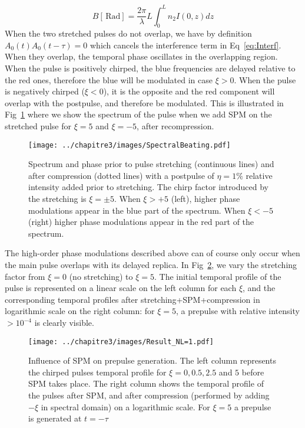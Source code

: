 \begin{equation}
B[\,\mathrm{Rad}] = \frac{2\pi}{\lambda}L \int_{0}^{L}n_2 I(0,z)dz
\end{equation}
\noindent  When the two stretched pulses do not overlap, we have by definition $A_0(t)A_0(t-\tau) = 0$ which cancels the interference term in Eq~\ref{eq:Interf}. When they overlap, the temporal phase oscillates in the overlapping region. When the pulse is positively chirped, the blue frequencies are delayed relative to the red ones, therefore the blue will be modulated in case $\xi>0$. When the pulse is negatively chirped ($\xi < 0$), it is the opposite and the red component will overlap with the postpulse, and therefore be modulated. This is illustrated in Fig~\ref{fig:SpectralBeating} where we show the spectrum of the pulse when we add SPM on the stretched pulse for $\xi = 5$ and $\xi = -5$, after recompression.


\begin{figure}[H]
\centering
\texttt{[image: ../chapitre3/images/SpectralBeating.pdf]}\\
\caption{\label{fig:SpectralBeating} Spectrum and phase prior to pulse stretching (continuous lines) and after compression (dotted lines) with a postpulse of $\eta = 1\%$ relative intensity added prior to stretching. The chirp factor introduced by the stretching is $\xi = \pm 5$. When $\xi>+5$ (left), higher phase modulations appear in the blue part of the spectrum. When $\xi <-5$ (right) higher phase modulations appear in the red part of the spectrum.}
\end{figure}




\noindent  The high-order phase modulations described above can of course only occur when the main pulse overlaps with its delayed replica. In Fig~\ref{fig:Result_NL=1}, we vary the stretching factor from $\xi = 0$ (no stretching) to $\xi = 5$. The initial temporal profile of the pulse is represented on a linear scale on the left column for each $\xi$, and the corresponding temporal profiles after stretching+SPM+compression in logarithmic scale on the right column: for $\xi = 5$, a prepulse with relative intensity $> 10^{-4}$ is clearly visible.

\begin{figure}[H]
\centering
\texttt{[image: ../chapitre3/images/Result\_NL=1.pdf]}\\
\caption{\label{fig:Result_NL=1} Influence of SPM on prepulse generation. The left column represents the chirped pulses temporal profile for $\xi = 0 , 0.5 , 2.5$ and $5$ before SPM takes place. The right column shows the temporal profile of the pulses after SPM, and after compression (performed by adding $-\xi$ in spectral domain) on a logarithmic scale. For $\xi = 5$ a prepulse is generated at $t = -\tau$}
\end{figure}

